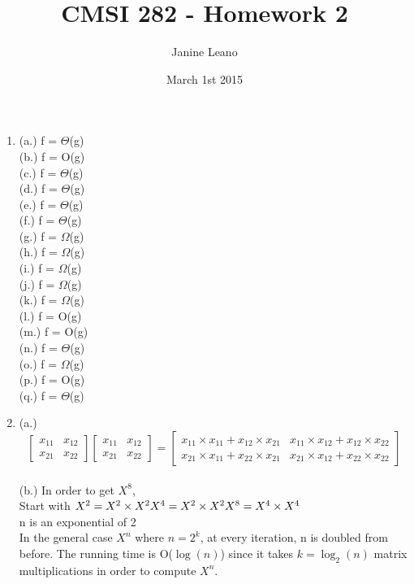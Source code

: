 \documentclass{article}
\title{CMSI 282 - Homework 2}
\author{Janine Leano}
\date{March 1st 2015}
\begin{document}
\maketitle

\begin{enumerate}
	\item 
		(a.) f = $\Theta$(g) \\
		(b.) f = O(g) \\
		(c.) f = $\Theta$(g) \\
		(d.) f = $\Theta$(g) \\
		(e.) f = $\Theta$(g) \\
		(f.) f = $\Theta$(g) \\
		(g.) f = $\Omega$(g) \\
		(h.) f = $\Omega$(g) \\
		(i.) f = $\Omega$(g) \\
		(j.) f = $\Omega$(g) \\
		(k.) f = $\Omega$(g) \\
		(l.) f = O(g) \\
		(m.) f = O(g) \\
		(n.) f = $\Theta$(g) \\
		(o.) f = $\Omega$(g) \\
		(p.) f = O(g) \\
		(q.) f = $\Theta$(g)
	\item
		(a.) \[
		\begin{bmatrix}
    			x_{11}       & x_{12} \\
    			x_{21}       & x_{22}  
		\end{bmatrix}
		\begin{bmatrix}
    			x_{11}       & x_{12} \\
    			x_{21}       & x_{22}  
		\end{bmatrix}
		=
		\begin{bmatrix}
    		x_{11} \times x_{11} + x_{12} \times x_{21} & x_{11} \times x_{12} + x_{12} \times x_{22}  \\
    		x_{21} \times x_{11} + x_{22} \times x_{21} & x_{21} \times x_{12} + x_{22} \times x_{22}
		\end{bmatrix}
		\] \\
		(b.) In order to get $X^{8}$, \\
		Start with $X^{2} = X^{2} \times X^{2} \\
		 X^{4} =  X^{2} \times  X^{2}  \\
		 X^{8} = X^{4} \times X^{4}$ \\
		 n is an exponential of 2 \\
		 In the general case $X^{n}$ where $n = 2^{k}$, at every iteration, n is doubled from before. The running time is O($\log(n)$) since it takes $k = \log_2(n)$ matrix multiplications in order to compute $X^{n}$.
		 

\end{enumerate}
\end{document}
